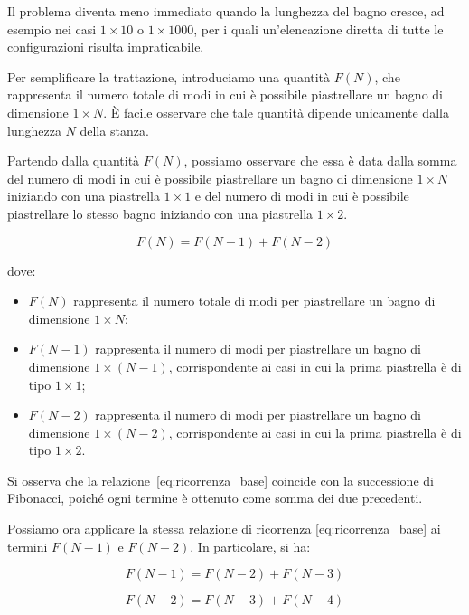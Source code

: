 Il problema diventa meno immediato quando la lunghezza del bagno cresce, ad esempio nei casi \(1 \times 10\) o \(1 \times 1000\), per i quali un’elencazione diretta di tutte le configurazioni risulta impraticabile.

\medskip

Per semplificare la trattazione, introduciamo una quantità \(F(N)\), che rappresenta il numero totale di modi in cui è possibile piastrellare un bagno di dimensione \(1 \times N\). È facile osservare che tale quantità dipende unicamente dalla lunghezza \(N\) della stanza.

Partendo dalla quantità \(F(N)\), possiamo osservare che essa è data dalla somma del numero di modi in cui è possibile piastrellare un bagno di dimensione \(1 \times N\) iniziando con una piastrella \(1 \times 1\) e del numero di modi in cui è possibile piastrellare lo stesso bagno iniziando con una piastrella \(1 \times 2\).

\begin{equation}
	F(N) = F(N-1) + F(N-2)
	\label{eq:ricorrenza_base}
\end{equation}



dove:
\begin{itemize}
	\item \(F(N)\) rappresenta il numero totale di modi per piastrellare un bagno di dimensione \(1 \times N\);
	\item \(F(N-1)\) rappresenta il numero di modi per piastrellare un bagno di dimensione \(1 \times (N-1)\), corrispondente ai casi in cui la prima piastrella è di tipo \(1 \times 1\);
	\item \(F(N-2)\) rappresenta il numero di modi per piastrellare un bagno di dimensione \(1 \times (N-2)\), corrispondente ai casi in cui la prima piastrella è di tipo \(1 \times 2\).
\end{itemize}

Si osserva che la relazione~\eqref{eq:ricorrenza_base} coincide con la successione di Fibonacci, poiché ogni termine è ottenuto come somma dei due precedenti.

Possiamo ora applicare la stessa relazione di ricorrenza \eqref{eq:ricorrenza_base} ai termini \(F(N-1)\) e \(F(N-2)\). In particolare, si ha:

\begin{equation}
	F(N-1) = F(N-2) + F(N-3)
	\label{eq:ricorrenza_FNmeno1}
\end{equation}

\begin{equation}
	F(N-2) = F(N-3) + F(N-4)
	\label{eq:ricorrenza_FNmeno2}
\end{equation}

